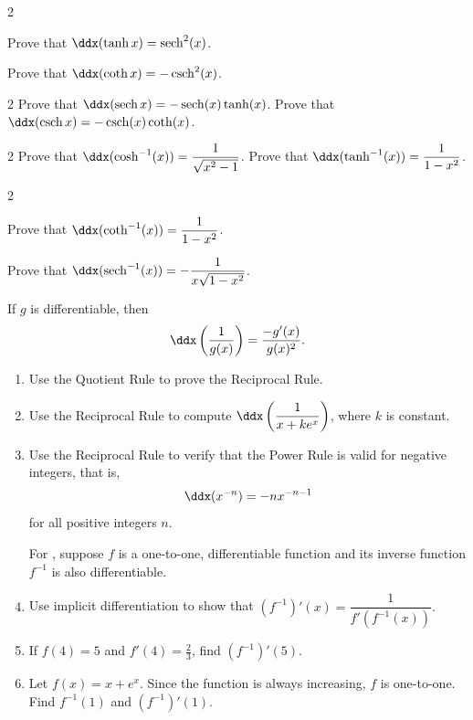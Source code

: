 \documentclass{book}
\DeclareMathOperator{\sech}{sech}
\DeclareMathOperator{\csch}{csch}
\begin{document}
\begin{enumerate}[!HW!]
\begin{multicols}{2}
\item Prove that $\ddx(\tanh x) = \sech^2(x)$.
\item Prove that $\ddx(\coth x) = -\csch^2(x)$.
\end{multicols}
\begin{multicols}{2}
\itemspade Prove that $\ddx(\sech x) = -\sech(x)\tanh(x)$.
\itemspade Prove that $\ddx(\csch x) = -\csch(x)\coth(x)$.
\end{multicols}
\begin{multicols}{2}
\itemspade Prove that $\ddx(\cosh^{-1}(x)) = \dfrac{1}{\sqrt{x^2-1}}$.
\itemspade Prove that $\ddx(\tanh^{-1} (x)) = \dfrac{1}{1-x^2}$.
\end{multicols}
\begin{multicols}{2}
\item Prove that $\ddx(\coth^{-1} (x)) = \dfrac{1}{1-x^2}$.
\item Prove that $\ddx(\sech^{-1}(x)) = -\dfrac{1}{x\sqrt{1-x^2}}$.
\end{multicols}
\end{enumerate}
\pagebreak

\begin{Thm}\label{thm:reciprocal} If $g$ is differentiable, then \[\ddx\left(\dfrac{1}{g(x)}\right) = \dfrac{-g'(x)}{g(x)^2}.\]
\end{Thm}\vs
\begin{enumerate}[!HW!]
\item  Use the Quotient Rule to prove the Reciprocal Rule.
\item  Use the Reciprocal Rule to compute $\ddx\left(\dfrac{1}{x+ke^x}\right)$, where $k$ is constant.
\item Use the Reciprocal Rule to verify that the Power Rule is valid for negative integers, that is, \[\ddx(x^{-n}) = -nx^{-n-1}\] for all positive integers $n$.

For , suppose $f$ is a one-to-one, differentiable function and its inverse function $f^{-1}$ is also differentiable.
\item\label{exer:implicitproof:start} Use implicit differentiation to show that $(f^{-1})'(x) = \dfrac{1}{f'(f^{-1}(x))}.$
\item If $f(4)=5$ and $f'(4) = \frac{2}{3}$, find $(f^{-1})'(5)$.
\item\label{exer:implicitproof:stop} Let $f(x) = x+e^x$. Since the function is always increasing, $f$ is one-to-one. Find $f^{-1}(1)$ and $(f^{-1})'(1)$.
\end{enumerate}
\pagebreak
\pagebreak
\end{document}
